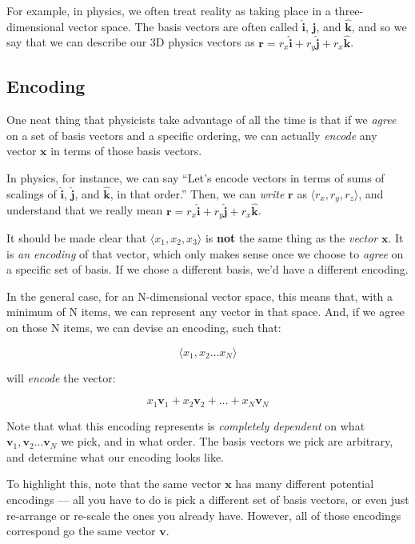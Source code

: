 \documentclass[]{article}
\begin{document}
For example, in physics, we often treat reality as taking place in a
three-dimensional vector space. The basis vectors are often called
\(\hat{\mathbf{i}}\), \(\hat{\mathbf{j}}\), and \(\hat{\mathbf{k}}\), and so we
say that we can describe our 3D physics vectors as
\(\mathbf{r} = r_x \hat{\mathbf{i}} + r_y \hat{\mathbf{j}} + r_x \hat{\mathbf{k}}\).

\hypertarget{encoding}{%
\subsection{Encoding}\label{encoding}}

One neat thing that physicists take advantage of all the time is that if we
\emph{agree} on a set of basis vectors and a specific ordering, we can actually
\emph{encode} any vector \(\mathbf{x}\) in terms of those basis vectors.

In physics, for instance, we can say ``Let's encode vectors in terms of sums of
scalings of \(\hat{\mathbf{i}}\), \(\hat{\mathbf{j}}\), and
\(\hat{\mathbf{k}}\), in that order.'' Then, we can \emph{write} \(\mathbf{r}\)
as \(\langle r_x, r_y, r_z \rangle\), and understand that we really mean
\(\mathbf{r} = r_x \hat{\mathbf{i}} + r_y \hat{\mathbf{j}} + r_x \hat{\mathbf{k}}\).

It should be made clear that \(\langle x_1, x_2, x_3 \rangle\) is \textbf{not}
the same thing as the \emph{vector} \(\mathbf{x}\). It is \emph{an encoding} of
that vector, which only makes sense once we choose to \emph{agree} on a specific
set of basis. If we chose a different basis, we'd have a different encoding.

In the general case, for an N-dimensional vector space, this means that, with a
minimum of N items, we can represent any vector in that space. And, if we agree
on those N items, we can devise an encoding, such that:

\[
\langle x_1, x_2 \dots x_N \rangle
\]

will \emph{encode} the vector:

\[
x_1 \mathbf{v}_1 + x_2 \mathbf{v}_2 + \ldots + x_N \mathbf{v}_N
\]

Note that what this encoding represents is \emph{completely dependent} on what
\(\mathbf{v}_1, \mathbf{v}_2 \ldots \mathbf{v}_N\) we pick, and in what order.
The basis vectors we pick are arbitrary, and determine what our encoding looks
like.

To highlight this, note that the same vector \(\mathbf{x}\) has many different
potential encodings --- all you have to do is pick a different set of basis
vectors, or even just re-arrange or re-scale the ones you already have. However,
all of those encodings correspond go the same vector \(\mathbf{v}\).
\end{document}

